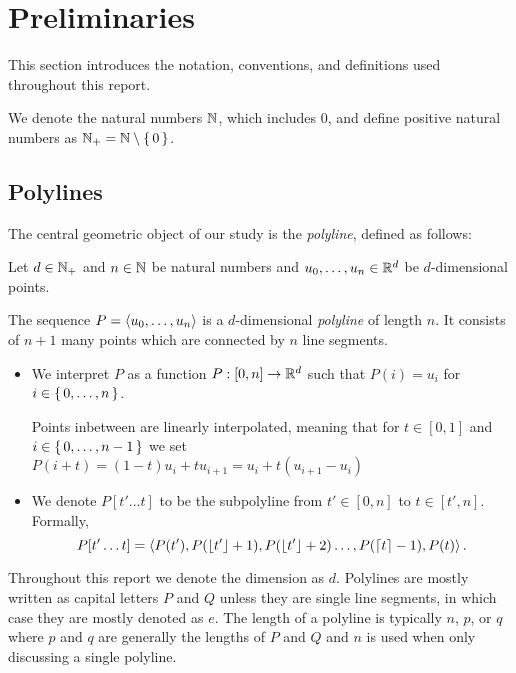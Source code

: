 \section{Preliminaries}
\label{sec:preliminaries}

This section introduces the notation, conventions, and definitions used throughout this report.  

We denote the natural numbers \(\mathbb{N}\), which includes \(0\), and define positive natural numbers as \(\mathbb{N}_+ = \mathbb{N} \setminus\set{0}\).

\subsection{Polylines}
\label{ssec:polylines}

The central geometric object of our study is the \emph{polyline}, defined as follows:

\begin{definition}[Polyline]
  Let \(d\in \mathbb{N}_+\) and \(n \in \mathbb{N}\) be natural numbers and \(u_0, \dots, u_n \in \mathbb{R}^d\) be \(d\)-dimensional points. 

  The sequence \(P = \left\langle u_0, \dots, u_n\right\rangle\) is a \(d\)-dimensional \emph{polyline} of length \(n\). It consists of \(n+1\) many points which are connected by \(n\) line segments. 
  \begin{itemize}
    \item We interpret \(P\) as a function \(P:[0,n] \to \mathbb{R}^d\) such that \(P(i) = u_i\) for \(i \in \set{0, \dots, n}\).

      Points inbetween are linearly interpolated, meaning that for \(t \in [0, 1]\) and \(i \in \set{0, \dots, n - 1}\) we set \(P(i + t) = (1- t)u_i + t u_{i+1} = u_i + t(u_{i+1} - u_i)\)
    \item We denote \(P[t'\dots t]\) to be the subpolyline from \(t' \in [0, n]\) to \(t \in [t', n]\). Formally, \[P[t'\dots t] = \left\langle P(t'), P(\left\lfloor t'\right\rfloor + 1),  P(\left\lfloor t'\right\rfloor + 2) \dots, P(\left\lceil t\right\rceil - 1), P(t)\right\rangle.\]
  \end{itemize}

\end{definition}
Throughout this report we denote the dimension as \(d\). Polylines are mostly written as capital letters \(P\) and \(Q\) unless they are single line segments, in which case they are mostly denoted as \(e\). The length of a polyline is typically \(n\), \(p\), or \(q\) where \(p\) and \(q\) are generally the lengths of \(P\) and \(Q\) and \(n\) is used when only discussing a single polyline.


